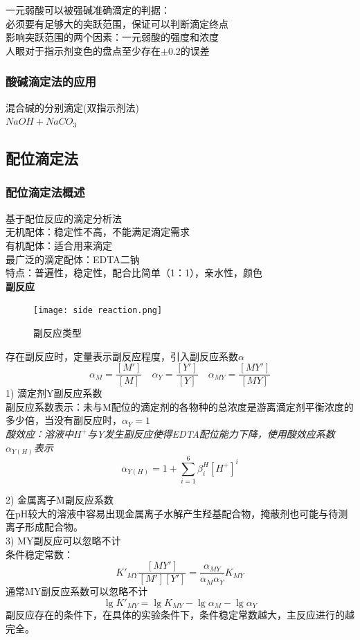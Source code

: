 \documentclass[utf8,a4paper,12pt]{ctexart}
\begin{document}
一元弱酸可以被强碱准确滴定的判据：\\
必须要有足够大的突跃范围，保证可以判断滴定终点\\
影响突跃范围的两个因素：一元弱酸的强度和浓度\\
人眼对于指示剂变色的盘点至少存在$\pm 0.2$的误差\\
\subsubsection{酸碱滴定法的应用}
混合碱的分别滴定(双指示剂法)\\
$NaOH + NaCO_3$\\

\subsection{配位滴定法}
\subsubsection{配位滴定法概述}
基于配位反应的滴定分析法\\
无机配体：稳定性不高，不能满足滴定需求\\
有机配体：适合用来滴定\\
最广泛的滴定配体：EDTA二钠\\
特点：普遍性，稳定性，配合比简单（1：1），亲水性，颜色\\
{\bf 副反应}
\begin{figure}[H]
\centering
\texttt{[image: side reaction.png]}
\caption{副反应类型}
\end{figure}
存在副反应时，定量表示副反应程度，引入副反应系数$\alpha$
\[\alpha_M = \frac{[M']}{[M]}\quad \alpha_Y = \frac{[Y']}{[Y]}\quad\alpha_{MY} = \frac{[MY']}{[MY]}\]
1) 滴定剂Y副反应系数\\
副反应系数表示：未与M配位的滴定剂的各物种的总浓度是游离滴定剂平衡浓度的多少倍，当没有副反应时，$\alpha_Y = 1$\\
\emph{酸效应：溶液中$H^+$与Y发生副反应使得EDTA配位能力下降，使用酸效应系数$\alpha_{Y(H)}$表示}
\[\alpha_{Y(H)} = 1 + \sum^6_{i=1}\beta^H_i[H^+]^i\]

2) 金属离子M副反应系数\\
在pH较大的溶液中容易出现金属离子水解产生羟基配合物，掩蔽剂也可能与待测离子形成配合物。\\
3) MY副反应可以忽略不计\\
条件稳定常数：
\[K'_{MY}\frac{[MY']}{[M'][Y']} = \frac{\alpha_{MY}}{\alpha_M\alpha_Y}K_{MY}\]
通常MY副反应系数可以忽略不计
\[\lg K'_{MY} = \lg K_{MY} - \lg\alpha_M-\lg\alpha_Y\]
副反应存在的条件下，在具体的实验条件下，条件稳定常数越大，主反应进行的越完全。\\
\end{document}
